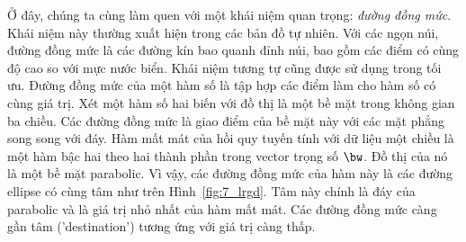 Ở đây, chúng ta cùng làm quen với một khái niệm quan trọng: \textit{đường đồng
mức}. Khái niệm này thường xuất hiện trong các bản đồ tự nhiên. Với các ngọn
núi, đường đồng mức là các đường kín bao quanh đỉnh núi, bao gồm các điểm có
cùng độ cao so với mực nước biển. Khái niệm tương tự cũng được sử dụng trong tối
ưu. {Đường đồng mức} của một hàm số là tập hợp các điểm làm cho hàm số có cùng
giá trị. Xét một hàm số hai biến với đồ thị là một {bề mặt} trong
không gian ba chiều. Các đường đồng mức là giao điểm của bề mặt này với các mặt
phẳng song song với đáy. Hàm mất mát của hồi quy tuyến tính với dữ liệu một
chiều là một hàm bậc hai theo hai thành phần trong vector trọng số $\bw$. Đồ thị
của nó là một bề mặt parabolic. Vì vậy, các đường đồng mức của hàm này là các
đường ellipse có cùng tâm như trên Hình~\ref{fig:7_lrgd}. Tâm này chính là đáy
của parabolic và là giá trị nhỏ nhất của hàm mất mát. Các đường đồng mức càng
gần {tâm} ('destination') tương ứng với giá trị càng thấp.%
 
 
 
 
 
 
